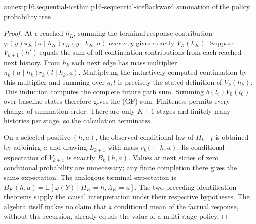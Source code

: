 \begin{annexitem}{annex:p16.sequential-ice}{thm:p16-sequential-ice}{Backward summation of the policy probability tree}
\begin{proof}
At a reached \(h_K\), summing the terminal response contribution
\(\varphi(y)\pi_K(a\mid h_K)r_K(y\mid h_K,a)\) over \(a,y\)
gives exactly \(V_K(h_K)\). Suppose \(V_{k+1}(h')\) equals the sum of
all continuation contributions from each reached next history. From \(h_k\)
each next edge has mass multiplier
\(\pi_k(a\mid h_k)r_k(l\mid h_k,a)\). Multiplying the inductively
computed continuation by this multiplier and summing over \(a,l\)
is precisely the stated definition of \(V_k(h_k)\). This induction
computes the complete future path sum. Summing \(b(l_0)V_0(l_0)\)
over baseline states therefore gives the (GF) sum. Finiteness permits
every change of summation order. There are only \(K+1\) stages and
finitely many histories per stage, so the calculation terminates.

On a selected positive \((h,a)\), the observed conditional law of
\(H_{k+1}\) is obtained by adjoining \(a\) and drawing \(L_{k+1}\)
with mass \(r_k(\cdot\mid h,a)\). Its conditional expectation of
\(V_{k+1}\) is exactly \(B_k(h,a)\). Values at next states of zero
conditional probability are unnecessary; any finite completion there
gives the same expectation. The analogous terminal expectation is
\(B_K(h,a)=\mathbb E[\varphi(Y)\mid H_K=h,A_K=a]\).
The two preceding identification theorems supply the causal interpretation
under their respective hypotheses. The algebra itself makes no claim
that a conditional mean of the factual response, without this recursion,
already equals the value of a multi-stage policy.
\end{proof}
\end{annexitem}


